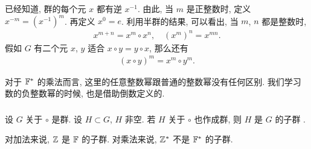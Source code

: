 \begin{definition}
    已经知道, 群的每个元 $x$ 都有逆 $x^{-1}$. 由此, 当 $m$ 是正整数时, 定义 $x^{-m} = (x^{-1})^m$. 再定义 $x^0 = e$. 利用半群的结果, 可以看出, 当 $m$, $n$ 都是整数时,
    \begin{align*}
        x^{m+n} = x^m \circ x^n, \quad (x^m)^n = x^{mn}.
    \end{align*}
    假如 $G$ 有二个元 $x$, $y$ 适合 $x \circ y = y \circ x$, 那么还有
    \begin{align*}
        (x \circ y)^m = x^m \circ y^m.
    \end{align*}
\end{definition}

\begin{example}
    对于 $\mathbb{F}^{\ast}$ 的乘法而言, 这里的任意整数幂跟普通的整数幂没有任何区别. 我们学习数的负整数幂的时候, 也是借助倒数定义的.
\end{example}

\subsubsection*{\Subgroups}

\begin{definition}
    设 $G$ 关于 $\circ$ 是群. 设 $H \subset G$, $H$ 非空. 若 $H$ 关于 $\circ$ 也作成群, 则 $H$ 是 $G$ 的子群 .
\end{definition}

\begin{example}
    对加法来说, $\mathbb{Z}$ 是 $\mathbb{F}$ 的子群. 对乘法来说, $\mathbb{Z}^{\ast}$ 不是 $\mathbb{F}^{\ast}$ 的子群.
\end{example}

